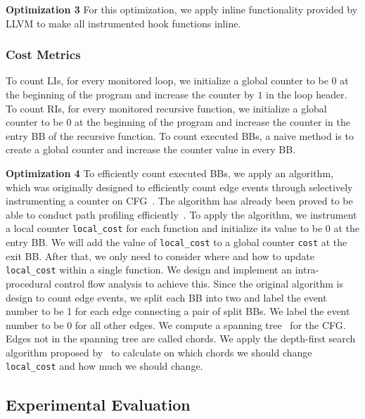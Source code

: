 \textbf{Optimization 3}
For this optimization, we apply inline functionality 
provided by LLVM to make all instrumented hook functions inline.

\subsubsection{Cost Metrics}
To count LIs, for every monitored loop, we initialize 
a global counter to be $0$ at the beginning of the program and 
increase the counter by $1$ in the loop header.
To count RIs, for every monitored recursive function, 
we initialize a global counter to be $0$ at the beginning of the program
and increase the counter 
in the entry BB of the recursive function. 
To count executed BBs, a naive method is to create a global counter
and increase the counter value in every BB. 


\textbf{Optimization 4}
To efficiently count executed BBs, 
we apply an algorithm, which was originally designed to 
efficiently count edge events through selectively instrumenting a counter 
on CFG~\cite{event-counting}.
The algorithm has already been proved to be able to 
conduct path profiling efficiently~\cite{peter-ase,path-profiling}. 
To apply the algorithm,
we instrument a local counter \texttt{local\_cost} for each function
and initialize its value to be $0$ at the entry BB. 
We will add the value of \texttt{local\_cost} to a global counter \texttt{cost} 
at the exit BB.
After that, we only need to consider where 
and how to update \texttt{local\_cost} 
within a single function.
We design and implement an intra-procedural control flow analysis
to achieve this.
Since the original algorithm is design to count edge events,
we split each BB into two 
and label the event number to be 1 for each edge connecting a pair of split BBs. 
We label the event number to be 0 for all other edges.
We compute a spanning tree~\cite{spanning} for the CFG.
Edges not in the spanning tree are called chords.
We apply the depth-first search algorithm proposed by~\citet{event-counting} 
to calculate on which chords we should change 
\texttt{local\_cost} 
and how much we should change.

\subsection{Experimental Evaluation}
\label{sec:inhouse_exp}


